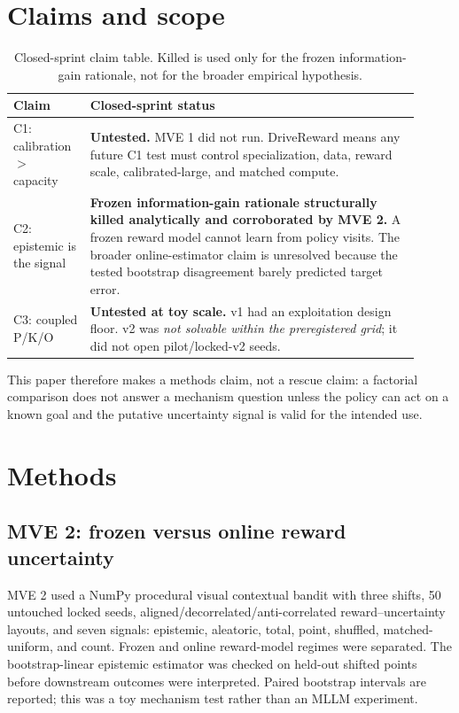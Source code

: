 \documentclass{article}
\begin{document}
\section{Claims and scope}
\begin{table}[t]
\caption{Closed-sprint claim table. Killed is used only for the frozen information-gain rationale, not for the broader empirical hypothesis.}
\label{tab:claims}
\centering
\small
\begin{tabular}{p{0.17\linewidth}p{0.74\linewidth}}
\toprule
Claim & Closed-sprint status \\
\midrule
C1: calibration $>$ capacity & \textbf{Untested.} MVE 1 did not run. DriveReward means any future C1 test must control specialization, data, reward scale, calibrated-large, and matched compute. \\
C2: epistemic is the signal & \textbf{Frozen information-gain rationale structurally killed analytically and corroborated by MVE 2.} A frozen reward model cannot learn from policy visits. The broader online-estimator claim is unresolved because the tested bootstrap disagreement barely predicted target error. \\
C3: coupled P/K/O & \textbf{Untested at toy scale.} v1 had an exploitation design floor. v2 was \emph{not solvable within the preregistered grid}; it did not open pilot/locked-v2 seeds. \\
\bottomrule
\end{tabular}
\end{table}

This paper therefore makes a methods claim, not a rescue claim: a factorial comparison does not answer a mechanism question unless the policy can act on a known goal and the putative uncertainty signal is valid for the intended use.

\section{Methods}
\subsection{MVE 2: frozen versus online reward uncertainty}
MVE 2 used a NumPy procedural visual contextual bandit with three shifts, 50 untouched locked seeds, aligned/decorrelated/anti-correlated reward--uncertainty layouts, and seven signals: epistemic, aleatoric, total, point, shuffled, matched-uniform, and count. Frozen and online reward-model regimes were separated. The bootstrap-linear epistemic estimator was checked on held-out shifted points before downstream outcomes were interpreted. Paired bootstrap intervals are reported; this was a toy mechanism test rather than an MLLM experiment.
\end{document}
